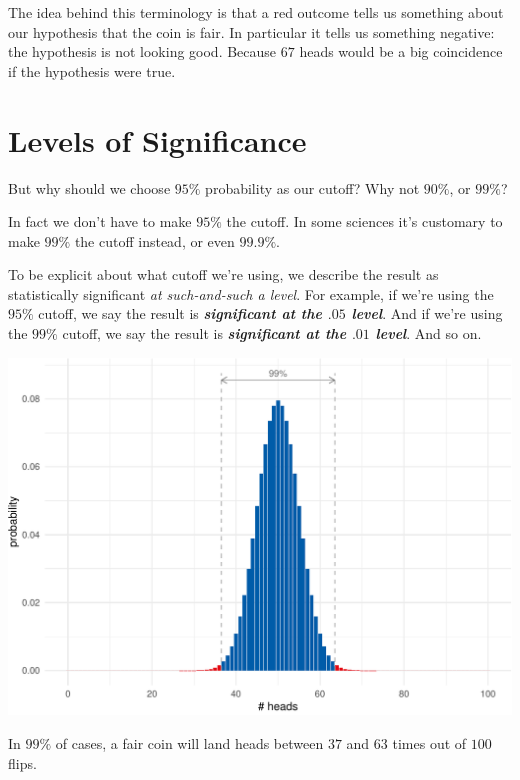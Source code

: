 \documentclass[justified]{tufte-book}
\theoremstyle{definition}
\theoremstyle{definition}
\theoremstyle{definition}
\theoremstyle{definition}
\theoremstyle{remark}
\begin{document}
The idea behind this terminology is that a red outcome tells us something about our hypothesis that the coin is fair. In particular it tells us something negative: the hypothesis is not looking good. Because \(67\) heads would be a big coincidence if the hypothesis were true.

\hypertarget{levels-of-significance}{%
\section{Levels of Significance}\label{levels-of-significance}}

But why should we choose \(95\%\) probability as our cutoff? Why not \(90\%\), or \(99\%\)?

In fact we don't have to make \(95\%\) the cutoff. In some sciences it's customary to make \(99\%\) the cutoff instead, or even \(99.9\%\).

To be explicit about what cutoff we're using, we describe the result as statistically significant \emph{at such-and-such a level}. For example, if we're using the \(95\%\) cutoff, we say the result is \textbf{\emph{significant at the \(.05\) level}}. And if we're using the \(99\%\) cutoff, we say the result is \textbf{\emph{significant at the \(.01\) level}}. And so on.

\begin{marginfigure}
\includegraphics{_main_files/figure-latex/binom100fences99-1} \caption[In $99\%$ of cases, a fair coin will land heads between $37$ and $63$ times out of $100$ flips]{In $99\%$ of cases, a fair coin will land heads between $37$ and $63$ times out of $100$ flips.}\label{fig:binom100fences99}
\end{marginfigure}
\end{document}
